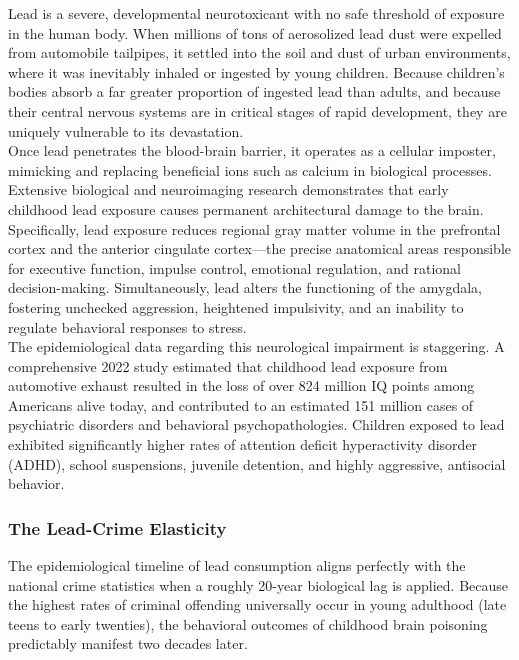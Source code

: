 \documentclass[
]{article}
\begin{document}
Lead is a severe, developmental neurotoxicant with no safe threshold of
exposure in the human body. When millions of tons of aerosolized lead
dust were expelled from automobile tailpipes, it settled into the soil
and dust of urban environments, where it was inevitably inhaled or
ingested by young children. Because children's bodies absorb a far
greater proportion of ingested lead than adults, and because their
central nervous systems are in critical stages of rapid development,
they are uniquely vulnerable to its devastation.\\
Once lead penetrates the blood-brain barrier, it operates as a cellular
imposter, mimicking and replacing beneficial ions such as calcium in
biological processes. Extensive biological and neuroimaging research
demonstrates that early childhood lead exposure causes permanent
architectural damage to the brain. Specifically, lead exposure reduces
regional gray matter volume in the prefrontal cortex and the anterior
cingulate cortex---the precise anatomical areas responsible for
executive function, impulse control, emotional regulation, and rational
decision-making. Simultaneously, lead alters the functioning of the
amygdala, fostering unchecked aggression, heightened impulsivity, and an
inability to regulate behavioral responses to stress.\\
The epidemiological data regarding this neurological impairment is
staggering. A comprehensive 2022 study estimated that childhood lead
exposure from automotive exhaust resulted in the loss of over 824
million IQ points among Americans alive today, and contributed to an
estimated 151 million cases of psychiatric disorders and behavioral
psychopathologies. Children exposed to lead exhibited significantly
higher rates of attention deficit hyperactivity disorder (ADHD), school
suspensions, juvenile detention, and highly aggressive, antisocial
behavior.

\subsubsection{\texorpdfstring{\textbf{The Lead-Crime
Elasticity}}{The Lead-Crime Elasticity}}\label{the-lead-crime-elasticity}

The epidemiological timeline of lead consumption aligns perfectly with
the national crime statistics when a roughly 20-year biological lag is
applied. Because the highest rates of criminal offending universally
occur in young adulthood (late teens to early twenties), the behavioral
outcomes of childhood brain poisoning predictably manifest two decades
later.
\end{document}

